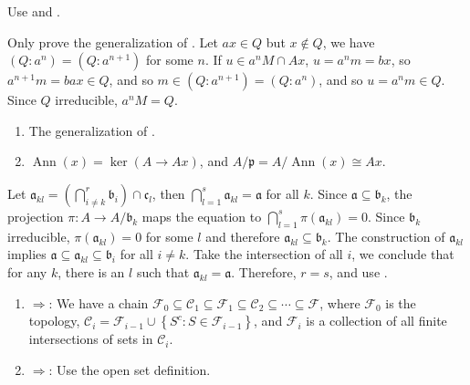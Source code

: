 \begin{exercise}\label{ex7.16}
	Use  and .
\end{exercise}

\begin{exercise}\label{ex7.17}
	Only prove the generalization of . Let $ax\in Q$ but $x\notin Q$, we have $\left(Q:a^n\right)=\left(Q:a^{n+1}\right)$ for some $n$. If $u\in a^nM\cap Ax$, $u=a^nm=bx$, so $a^{n+1}m=bax\in Q$, and so $m\in\left(Q:a^{n+1}\right)=\left(Q:a^n\right)$, and so $u=a^nm\in Q$. Since $Q$ irreducible, $a^nM=Q$.
\end{exercise}

\begin{exercise}\label{ex7.18}
	\begin{enumerate}
		\item[(i) $\Leftrightarrow$ (ii)] The generalization of .
		\item[(ii) $\Leftrightarrow$ (iii)] $\operatorname{Ann}(x)=\ker(A\rightarrow Ax)$, and $A/\mathfrak{p}=A/\operatorname{Ann}(x)\cong Ax$.
	\end{enumerate}
\end{exercise}

\begin{exercise}\label{ex7.19}
	Let $\mathfrak{a}_{kl}=\left(\bigcap_{i\neq k}^r\mathfrak{b}_i\right)\cap\mathfrak{c}_l$, then $\bigcap_{l=1}^s\mathfrak{a}_{kl}=\mathfrak{a}$ for all $k$. Since $\mathfrak{a}\subseteq\mathfrak{b}_k$, the projection $\pi:A\rightarrow A/\mathfrak{b}_k$ maps the equation to $\bigcap_{l=1}^s\pi\left(\mathfrak{a}_{kl}\right)=0$. Since $\mathfrak{b}_k$ irreducible, $\pi\left(\mathfrak{a}_{kl}\right)=0$ for some $l$ and therefore $\mathfrak{a}_{kl}\subseteq\mathfrak{b}_k$. The construction of $\mathfrak{a}_{kl}$ implies $\mathfrak{a}\subseteq\mathfrak{a}_{kl}\subseteq\mathfrak{b}_i$ for all $i\neq k$. Take the intersection of all $i$, we conclude that for any $k$, there is an $l$ such that $\mathfrak{a}_{kl}=\mathfrak{a}$. Therefore, $r=s$, and use .
\end{exercise}

\begin{exercise}\label{ex7.20}
	\begin{enumerate}[label=(\roman*),ref=\theexercise(\roman*)]
		\item $\Rightarrow$: We have a chain $\mathcal{F}_0\subseteq\mathcal{C}_1\subseteq\mathcal{F}_1\subseteq\mathcal{C}_2\subseteq\cdots\subseteq\mathcal{F}$, where $\mathcal{F}_0$ is the topology, $\mathcal{C}_i=\mathcal{F}_{i-1}\cup\left\{S^c:S\in\mathcal{F}_{i-1}\right\}$, and $\mathcal{F}_i$ is a collection of all finite intersections of sets in $\mathcal{C}_i$.
		\item\label{ex7.21.2} $\Rightarrow$: Use the open set definition.
	\end{enumerate}
\end{exercise}


